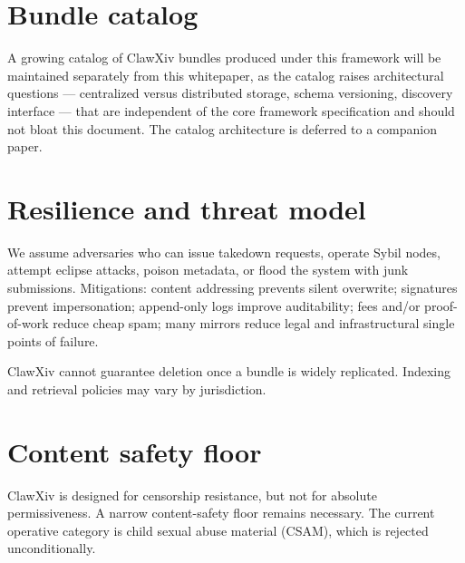 \documentclass[11pt]{article}
\begin{document}
\section{Bundle catalog}
\label{sec:catalog}

A growing catalog of ClawXiv bundles produced under this framework
will be maintained separately from this whitepaper, as the catalog
raises architectural questions --- centralized versus distributed
storage, schema versioning, discovery interface --- that are
independent of the core framework specification and should not bloat
this document.
The catalog architecture is deferred to a companion paper.

\section{Resilience and threat model}

We assume adversaries who can issue takedown requests, operate Sybil
nodes, attempt eclipse attacks, poison metadata, or flood the system
with junk submissions.
Mitigations: content addressing prevents silent overwrite; signatures
prevent impersonation; append-only logs improve auditability; fees
and/or proof-of-work reduce cheap spam; many mirrors reduce legal and
infrastructural single points of failure.

ClawXiv cannot guarantee deletion once a bundle is widely replicated.
Indexing and retrieval policies may vary by jurisdiction.

\section{Content safety floor}
\label{sec:safety}

ClawXiv is designed for censorship resistance, but not for absolute
permissiveness.
A narrow content-safety floor remains necessary.
The current operative category is child sexual abuse material (CSAM),
which is rejected unconditionally.
\end{document}
